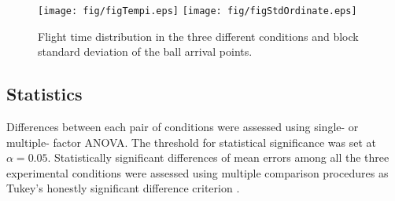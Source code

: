 \begin{figure}[tbp]
	\centering
		\texttt{[image: fig/figTempi.eps]}
			\texttt{[image: fig/figStdOrdinate.eps]}
	\caption{Flight time distribution in the three different conditions and block standard deviation of the ball arrival points.}
	\label{figTempi}
\end{figure}




\subsection{Statistics}
Differences between each pair of conditions were assessed using single- or multiple- factor
ANOVA. The threshold for statistical significance was set at $\alpha =
0.05$. Statistically significant differences of mean errors among all the three
experimental conditions were assessed using multiple comparison procedures as Tukey's honestly significant difference criterion \citep{Hochberg}.